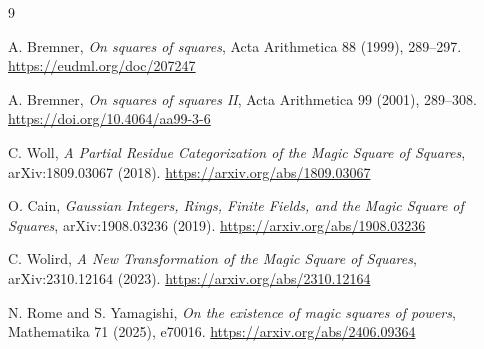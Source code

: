 \documentclass[11pt]{article}
\theoremstyle{definition}
\theoremstyle{remark}
\begin{document}
\begin{thebibliography}{9}

A. Bremner,
\emph{On squares of squares},
Acta Arithmetica 88 (1999), 289--297.
\url{https://eudml.org/doc/207247}

A. Bremner,
\emph{On squares of squares II},
Acta Arithmetica 99 (2001), 289--308.
\url{https://doi.org/10.4064/aa99-3-6}

C. Woll,
\emph{A Partial Residue Categorization of the Magic Square of Squares},
arXiv:1809.03067 (2018).
\url{https://arxiv.org/abs/1809.03067}

O. Cain,
\emph{Gaussian Integers, Rings, Finite Fields, and the Magic Square of
Squares}, arXiv:1908.03236 (2019).
\url{https://arxiv.org/abs/1908.03236}

C. Wolird,
\emph{A New Transformation of the Magic Square of Squares},
arXiv:2310.12164 (2023).
\url{https://arxiv.org/abs/2310.12164}

N. Rome and S. Yamagishi,
\emph{On the existence of magic squares of powers},
Mathematika 71 (2025), e70016.
\url{https://arxiv.org/abs/2406.09364}

\end{thebibliography}
\end{document}
